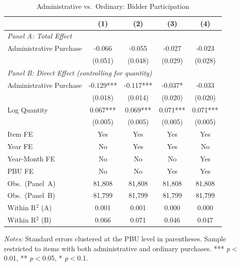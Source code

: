 \begin{table}[ht]
  \centering
  \caption{Administrative vs.\ Ordinary: Bidder Participation}
  \label{tab:v8_adm_firms}
  \small
  \begin{threeparttable}
  \begin{tabular}{lcccc}
    \hline\hline
    & (1) & (2) & (3) & (4) \\
    \hline
    \multicolumn{5}{l}{\textit{Panel A: Total Effect}} \\[3pt]
    Administrative Purchase & -0.066 & -0.055 & -0.027 & -0.023 \\
     & (0.051) & (0.048) & (0.029) & (0.028) \\[3pt]
    \hline
    \multicolumn{5}{l}{\textit{Panel B: Direct Effect (controlling for quantity)}} \\[3pt]
    Administrative Purchase & -0.129*** & -0.117*** & -0.037* & -0.033 \\
     & (0.018) & (0.014) & (0.020) & (0.020) \\[3pt]
    Log Quantity & 0.067*** & 0.069*** & 0.071*** & 0.071*** \\
     & (0.005) & (0.005) & (0.005) & (0.005) \\[3pt]
    \hline
    Item FE & Yes & Yes & Yes & Yes \\
    Year FE & No & Yes & Yes & No \\
    Year-Month FE & No & No & No & Yes \\
    PBU FE & No & No & Yes & Yes \\
    Obs.\ (Panel~A) & 81,808 & 81,808 & 81,808 & 81,808 \\
    Obs.\ (Panel~B) & 81,799 & 81,799 & 81,799 & 81,799 \\
    Within R$^2$ (A) & 0.001 & 0.001 & 0.000 & 0.000 \\
    Within R$^2$ (B) & 0.066 & 0.071 & 0.046 & 0.047 \\
    \hline\hline
  \end{tabular}
  \begin{tablenotes}
    \small
    \item \textit{Notes:} Standard errors clustered at the PBU level in parentheses. Sample restricted to items with both administrative and ordinary purchases. *** \textit{p}$<$0.01, ** \textit{p}$<$0.05, * \textit{p}$<$0.1.
  \end{tablenotes}
  \end{threeparttable}
\end{table}
